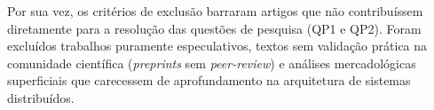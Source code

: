 Por sua vez, os critérios de exclusão barraram artigos que não contribuíssem diretamente para a resolução das questões de pesquisa (QP1 e QP2). Foram excluídos trabalhos puramente especulativos, textos sem validação prática na comunidade científica (\textit{preprints} sem \textit{peer-review}) e análises mercadológicas superficiais que carecessem de aprofundamento na arquitetura de sistemas distribuídos.
